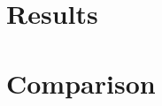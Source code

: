 \documentclass[10pt]{scrartcl}
\begin{document}
\section{Results}
    
    
    
    
    
    
    

\section{Comparison}
    






\end{document}
